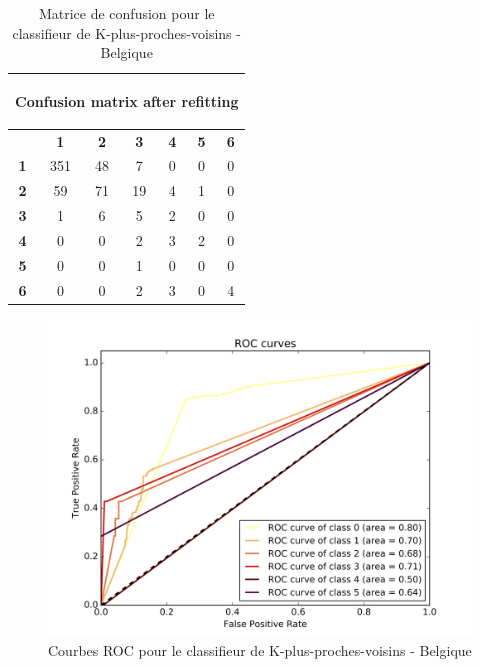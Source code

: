 \documentclass{book}
\begin{document}
\begin{table}[H]
  \begin{center}
  \begin{adjustbox}{max width=\textwidth}
  \begin{tabular}{|c|c|c|c|c|c|c|}
    \hline
    \multicolumn{7}{|c|}{{ \begin{bf}Confusion matrix after refitting\end{bf}}} \\
    \hline
     & \textbf{1} & \textbf{2} & \textbf{3} & \textbf{4} & \textbf{5} & \textbf{6}\\
    \hline
    \textbf{1} & 351 & 48 & 7 & 0 & 0 & 0\\
    \hline
    \textbf{2} & 59 & 71 & 19 & 4 & 1 & 0\\
    \hline
    \textbf{3} & 1 & 6 & 5 & 2 & 0 & 0\\
    \hline
    \textbf{4} & 0 & 0 & 2 & 3 & 2 & 0\\
    \hline
    \textbf{5} & 0 & 0 & 1 & 0 & 0 & 0\\
    \hline
    \textbf{6} & 0 & 0 & 2 & 3 & 0 & 4\\
    \hline
  \end{tabular}
  \end{adjustbox}
  \end{center}
  \caption{Matrice de confusion pour le classifieur de K-plus-proches-voisins - Belgique}
  \label{knn_cm_belgique}
\end{table}

\begin{figure}[H]
 \begin{center}
\includegraphics[scale=0.4]{../../data/Belgique/test/Nearest_Neighboors_Classification/Nearest_Neighboors_Classification_roc.png}
 \end{center}
 \caption{Courbes ROC pour le classifieur de K-plus-proches-voisins - Belgique}
 \label{knn_roc_belgique}
\end{figure}
\end{document}
